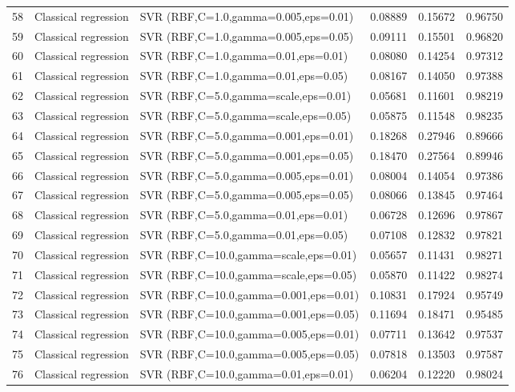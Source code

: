 \documentclass[10pt]{article}
\begin{document}
\begin{longtable}{C{0.75cm}L{2.35cm}L{8.0cm}C{1.15cm}C{1.15cm}C{1.15cm}}
58 & Classical regression & SVR (RBF,C=1.0,gamma=0.005,eps=0.01) & 0.08889 & 0.15672 & 0.96750 \\
59 & Classical regression & SVR (RBF,C=1.0,gamma=0.005,eps=0.05) & 0.09111 & 0.15501 & 0.96820 \\
60 & Classical regression & SVR (RBF,C=1.0,gamma=0.01,eps=0.01) & 0.08080 & 0.14254 & 0.97312 \\
61 & Classical regression & SVR (RBF,C=1.0,gamma=0.01,eps=0.05) & 0.08167 & 0.14050 & 0.97388 \\
62 & Classical regression & SVR (RBF,C=5.0,gamma=scale,eps=0.01) & 0.05681 & 0.11601 & 0.98219 \\
63 & Classical regression & SVR (RBF,C=5.0,gamma=scale,eps=0.05) & 0.05875 & 0.11548 & 0.98235 \\
64 & Classical regression & SVR (RBF,C=5.0,gamma=0.001,eps=0.01) & 0.18268 & 0.27946 & 0.89666 \\
65 & Classical regression & SVR (RBF,C=5.0,gamma=0.001,eps=0.05) & 0.18470 & 0.27564 & 0.89946 \\
66 & Classical regression & SVR (RBF,C=5.0,gamma=0.005,eps=0.01) & 0.08004 & 0.14054 & 0.97386 \\
67 & Classical regression & SVR (RBF,C=5.0,gamma=0.005,eps=0.05) & 0.08066 & 0.13845 & 0.97464 \\
68 & Classical regression & SVR (RBF,C=5.0,gamma=0.01,eps=0.01) & 0.06728 & 0.12696 & 0.97867 \\
69 & Classical regression & SVR (RBF,C=5.0,gamma=0.01,eps=0.05) & 0.07108 & 0.12832 & 0.97821 \\
70 & Classical regression & SVR (RBF,C=10.0,gamma=scale,eps=0.01) & 0.05657 & 0.11431 & 0.98271 \\
71 & Classical regression & SVR (RBF,C=10.0,gamma=scale,eps=0.05) & 0.05870 & 0.11422 & 0.98274 \\
72 & Classical regression & SVR (RBF,C=10.0,gamma=0.001,eps=0.01) & 0.10831 & 0.17924 & 0.95749 \\
73 & Classical regression & SVR (RBF,C=10.0,gamma=0.001,eps=0.05) & 0.11694 & 0.18471 & 0.95485 \\
74 & Classical regression & SVR (RBF,C=10.0,gamma=0.005,eps=0.01) & 0.07711 & 0.13642 & 0.97537 \\
75 & Classical regression & SVR (RBF,C=10.0,gamma=0.005,eps=0.05) & 0.07818 & 0.13503 & 0.97587 \\
76 & Classical regression & SVR (RBF,C=10.0,gamma=0.01,eps=0.01) & 0.06204 & 0.12220 & 0.98024 \\

\end{longtable}
\end{document}

